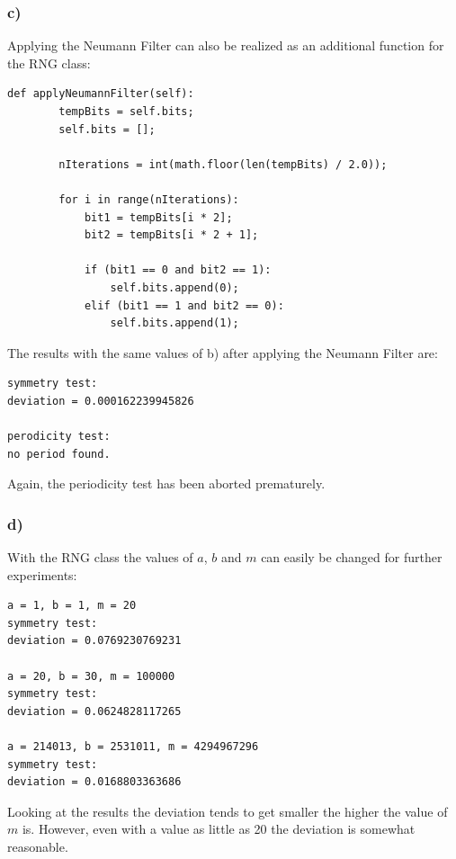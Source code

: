 \subsubsection{c)}

Applying the Neumann Filter can also be realized as an additional function for the RNG class:

\begin{lstlisting}[caption=Problem 3.6 c)]
	def applyNeumannFilter(self):
		tempBits = self.bits;
		self.bits = [];
		
		nIterations = int(math.floor(len(tempBits) / 2.0));
		
		for i in range(nIterations):
			bit1 = tempBits[i * 2];
			bit2 = tempBits[i * 2 + 1];
			
			if (bit1 == 0 and bit2 == 1):
				self.bits.append(0);
			elif (bit1 == 1 and bit2 == 0):
				self.bits.append(1);
\end{lstlisting}

The results with the same values of b) after applying the Neumann Filter are:

\begin{lstlisting}[caption=Result of 3.6 c), keywordstyle=\color{black}]
symmetry test:
deviation = 0.000162239945826

perodicity test:
no period found.
\end{lstlisting}

Again, the periodicity test has been aborted prematurely.


\subsubsection{d)}

With the RNG class the values of $a$, $b$ and $m$ can easily be changed for further experiments:

\begin{lstlisting}[caption=Result of 3.6 d), keywordstyle=\color{black}]
a = 1, b = 1, m = 20
symmetry test:
deviation = 0.0769230769231

a = 20, b = 30, m = 100000
symmetry test:
deviation = 0.0624828117265

a = 214013, b = 2531011, m = 4294967296
symmetry test:
deviation = 0.0168803363686
\end{lstlisting}

Looking at the results the deviation tends to get smaller the higher the value of $m$ is. However, even with a value as little as 20 the deviation is somewhat reasonable.


